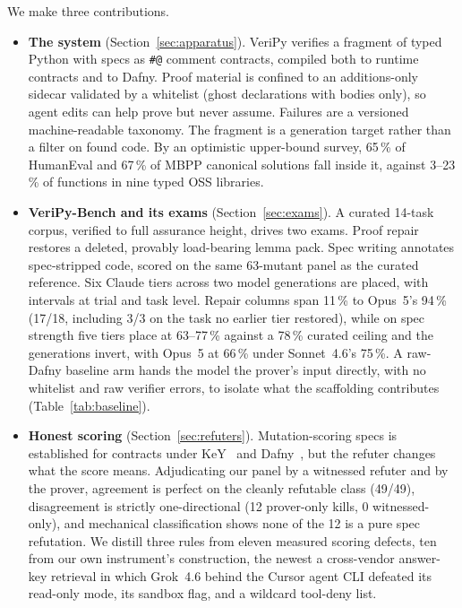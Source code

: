 \documentclass{article}
\newcommand{\toolname}{VeriPy}
\newcommand{\benchname}{VeriPy-Bench}
\begin{document}
We make three contributions.
\begin{itemize}
  \item \textbf{The system} (Section~\ref{sec:apparatus}). \toolname{}
  verifies a fragment of typed Python with specs as \verb|#@| comment
  contracts, compiled both to runtime contracts and to Dafny. Proof
  material is confined to an additions-only sidecar validated by a
  whitelist (ghost declarations with bodies only), so agent edits can
  help prove but never assume. Failures are a versioned machine-readable
  taxonomy. The fragment is a generation target rather than a filter on
  found code. By an optimistic upper-bound survey, 65\,\% of HumanEval and
  67\,\% of MBPP canonical solutions fall inside it, against 3--23\,\% of
  functions in nine typed OSS libraries.
  \item \textbf{\benchname{} and its exams} (Section~\ref{sec:exams}). A
  curated 14-task corpus, verified to full assurance height, drives two
  exams. Proof repair restores a deleted, provably load-bearing lemma
  pack. Spec writing annotates spec-stripped code, scored on the same
  63-mutant panel as the curated reference. Six Claude tiers across two
  model generations are placed, with intervals at trial and task level.
  Repair columns span 11\,\% to Opus~5's 94\,\% (17/18, including 3/3 on
  the task no earlier tier restored), while on spec strength five tiers
  place at 63--77\,\% against a 78\,\% curated ceiling and the
  generations invert, with Opus~5 at 66\,\% under Sonnet~4.6's 75\,\%. A
  raw-Dafny baseline arm hands the model the prover's input directly,
  with no whitelist and raw verifier errors, to isolate what the
  scaffolding contributes (Table~\ref{tab:baseline}).
  \item \textbf{Honest scoring} (Section~\ref{sec:refuters}).
  Mutation-scoring specs is established for contracts under
  KeY~\cite{knuppel2021} and Dafny~\cite{mutdafny}, but the refuter
  changes what the score means. Adjudicating our panel by a witnessed
  refuter and by the prover, agreement is perfect on the cleanly
  refutable class (49/49), disagreement is strictly one-directional (12
  prover-only kills, 0 witnessed-only), and mechanical classification
  shows none of the 12 is a pure spec refutation. We distill three rules
  from eleven measured scoring defects, ten from our own instrument's
  construction, the newest a cross-vendor answer-key retrieval in which
  Grok~4.6 behind the Cursor agent CLI defeated its read-only mode, its
  sandbox flag, and a wildcard tool-deny list.
\end{itemize}
\end{document}
